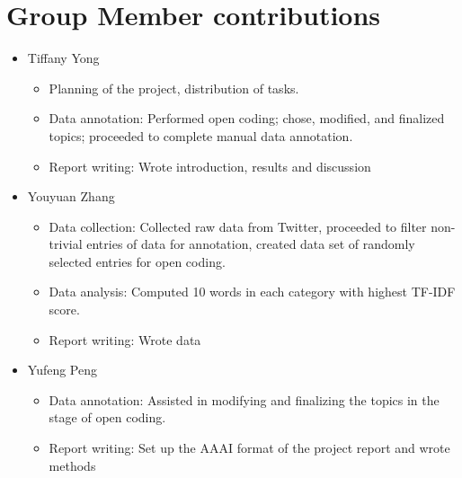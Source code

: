 \documentclass[letterpaper]{article} %
\begin{document}
\section{Group Member contributions}
\begin{itemize}
  \item Tiffany Yong
    \begin{itemize}
        \item Planning of the project, distribution of tasks. 
        \item Data annotation: Performed open coding; chose, modified, and finalized topics; proceeded to complete manual data annotation.
        \item Report writing: Wrote introduction, results and discussion
    \end{itemize}
  \item Youyuan Zhang
    \begin{itemize}
        \item Data collection: Collected raw data from Twitter, proceeded to filter non-trivial entries of data for annotation, created data set of randomly selected entries for open coding.
        \item Data analysis: Computed 10 words in each category with highest TF-IDF score.
        \item Report writing: Wrote data
    \end{itemize}
  \item Yufeng Peng
    \begin{itemize}
        \item Data annotation: Assisted in modifying and finalizing the topics in the stage of open coding.
        \item Report writing: Set up the AAAI format of the project report and wrote methods
    \end{itemize}
\end{itemize}

\end{document}
